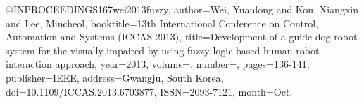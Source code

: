 @INPROCEEDINGS{167wei2013fuzzy,
author={Wei, Yuanlong and Kou, Xiangxin and Lee, Mincheol},
booktitle={13th International Conference on Control, Automation and Systems (ICCAS 2013)}, 
title={Development of a guide-dog robot system for the visually impaired by using fuzzy logic based human-robot interaction approach}, 
year={2013},
volume={},
number={},
pages={136-141},
publisher={IEEE},
address={Gwangju, South Korea},
doi={10.1109/ICCAS.2013.6703877},
ISSN={2093-7121},
month={Oct},}
